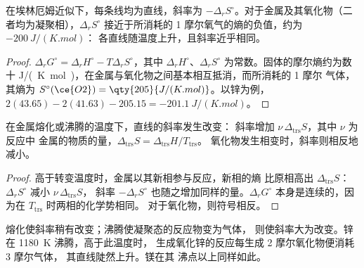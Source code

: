 \begin{proposition}[直线]\label{prop:b2:ellingham:line}
在埃林厄姆近似下，每条线均为直线，斜率为 $-\Delta_r
S^\circ$。对于金属及其氧化物（二者均为凝聚相），$\Delta_r S^\circ$
接近于所消耗的 1 摩尔氧气的熵的负值，约为
$-\qty{200}{J/(K.mol)}$：
各直线随温度上升，且斜率近乎相同。
\end{proposition}

\begin{proof}
$\Delta_r G^\circ = \Delta_r H^\circ - T\Delta_r S^\circ$，其中 $\Delta_r
H^\circ$、$\Delta_r S^\circ$ 为常数。固体的摩尔熵约为数十
\unit{J/(K.mol)}，在金属与氧化物之间基本相互抵消，而所消耗的 1 摩尔
气体，其熵为 $S^\circ(\ce{O2}) = \qty{205}{J/(K.mol)}$。以锌为例，
$2(43.65) - 2(41.63) - 205.15 = \qty{-201.1}{J/(K.mol)}$。
\end{proof}

\begin{proposition}[直线的转折]\label{prop:b2:ellingham:break}
在金属熔化或沸腾的温度下，直线的斜率发生改变：
斜率增加 $\nu\,\Delta_{\text{trs}}S$，其中 $\nu$ 为反应中
金属的物质的量，$\Delta_{\text{trs}}S = \Delta_{\text{trs}}H/T_{\text{trs}}$。
氧化物发生相变时，斜率则相反地减小。
\end{proposition}

\begin{proof}
高于转变温度时，金属以其新相参与反应，新相的熵
比原相高出 $\Delta_{\text{trs}}S$：$\Delta_r S^\circ$ 减小 $\nu\,\Delta_{\text{trs}}S$，
斜率 $-\Delta_r S^\circ$ 也随之增加同样的量。$\Delta_r G^\circ$
本身是连续的，因为在 $T_{\text{trs}}$ 时两相的化学势相同。
对于氧化物，则符号相反。
\end{proof}

熔化使斜率稍有改变；沸腾使凝聚态的反应物变为气体，
则使斜率大为改变。锌在 \qty{1180}{K} 沸腾，高于此温度时，
生成氧化锌的反应每生成 2 摩尔氧化物便消耗 3 摩尔气体，
其直线陡然上升。镁在其
沸点以上同样如此。

